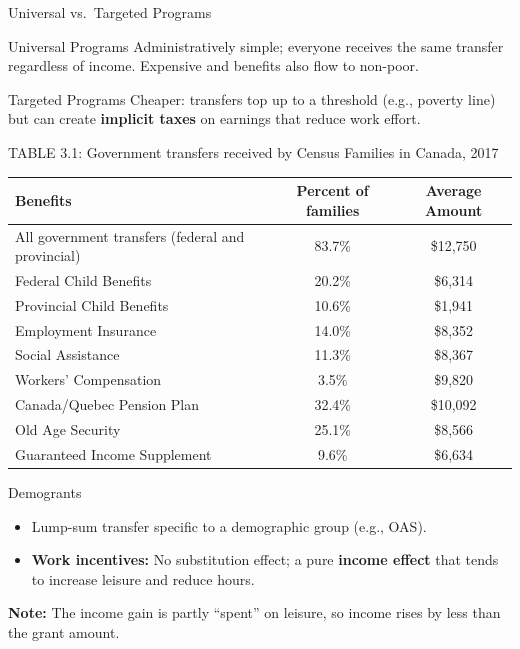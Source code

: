 \documentclass[aspectratio=169]{beamer}
\begin{document}
\begin{frame}{Universal vs.\ Targeted Programs}
\transfade
\begin{block}{Universal Programs}
Administratively simple; everyone receives the same transfer regardless of income. Expensive and benefits also flow to non-poor.
\end{block}
\begin{block}{Targeted Programs}
Cheaper: transfers top up to a threshold (e.g., poverty line) but can create \textbf{implicit taxes} on earnings that reduce work effort.
\end{block}
\end{frame}

\begin{frame}{TABLE 3.1: Government transfers received by Census Families in Canada, 2017}
\transfade
\small
\begin{tabular}{lcc}
\toprule
\textbf{Benefits} & \textbf{Percent of families} & \textbf{Average Amount} \\
\midrule
All government transfers (federal and provincial) & 83.7\% & \$12,750 \\
Federal Child Benefits & 20.2\% & \$6,314 \\
Provincial Child Benefits & 10.6\% & \$1,941 \\
Employment Insurance & 14.0\% & \$8,352 \\
Social Assistance & 11.3\% & \$8,367 \\
Workers’ Compensation & 3.5\% & \$9,820 \\
Canada/Quebec Pension Plan & 32.4\% & \$10,092 \\
Old Age Security & 25.1\% & \$8,566 \\
Guaranteed Income Supplement & 9.6\% & \$6,634 \\
\bottomrule
\end{tabular}
\end{frame}


\begin{frame}{Demogrants}
\transfade
\begin{itemize}[<+->]
  \item Lump-sum transfer specific to a demographic group (e.g., OAS).
  \item \textbf{Work incentives:} No substitution effect; a pure \textbf{income effect} that tends to increase leisure and reduce hours.
  \end{itemize}
  \vspace{0.5cm}
\textbf{Note:} The income gain is partly “spent” on leisure, so income rises by less than the grant amount.

\end{frame}
\end{document}
